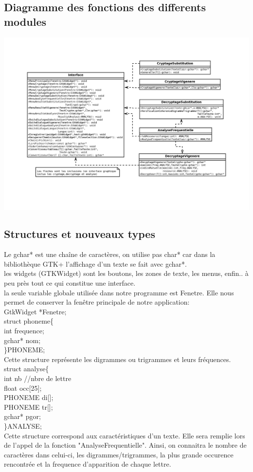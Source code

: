 \documentclass[a4]{article}
\begin{document}
		\subsection{Diagramme des fonctions des differents modules}
		\includegraphics[scale=0.8]{diaa.jpg}
		\subsection{Structures et nouveaux types}
		Le gchar* est une chaîne de caractères, on utilise pas char* car dans la bibliothèque
		GTK+ l'affichage d'un texte se fait avec gchar*.\\
		
		les widgets (GTKWidget) sont les boutons, les zones de texte, les menus, enfin.. à peu 
		près tout ce qui constitue une interface.\\
		
		la seule  variable globale utilisée dans notre programme est Fenetre. Elle nous permet de
		conserver la fenêtre principale de notre application:\\
		GtkWidget *Fenetre; \\
		
	struct phoneme\{\\
		int frequence;\\
		gchar* nom;\\
	\}PHONEME;\\
	Cette structure représente les digrammes ou trigrammes et leurs fréquences.\\
	
	struct analyse\{ \\
		int nb //nbre de lettre \\
		float occ[25];\\
		PHONEME di[];\\
		PHONEME tr[];\\
		gchar* pgor;\\
	\}ANALYSE;\\
	Cette structure correspond aux caractéristiques d'un texte. Elle sera remplie lors de
	l'appel de la fonction "AnalyseFrequentielle". Ainsi, on connaitra
	le nombre de caractères dans celui-ci, les digrammes/trigrammes, la plus grande occurence
	rencontrée et la frequence d'apparition de chaque lettre.\\
	
\end{document}

